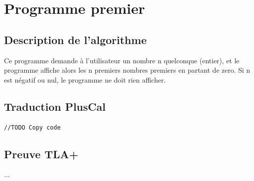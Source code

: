 \documentclass{scrreprt}
\begin{document}
%
%
%

\chapter{Programme premier}

\section{Description de l'algorithme}
Ce programme demande à l'utilisateur un nombre n quelconque (entier), et le programme affiche alors les n premiers nombres premiers en partant de zero. Si n est négatif ou nul, le programme ne doit rien afficher.

\section{Traduction PlusCal}
\begin{lstlisting}
//TODO Copy code
\end{lstlisting}

\section{Preuve TLA+}
...
\end{document}

